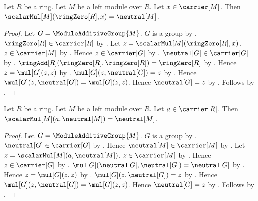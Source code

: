 \begin{theorem}\label{module_scalar_zero}
    Let $R$ be a ring.
    Let $M$ be a left module over $R$.
    Let $x\in\carrier[M]$.
    Then $\scalarMul[M](\ringZero[R],x)=\neutral[M]$.
\end{theorem}
\begin{proof}
    Let $G=\ModuleAdditiveGroup{M}$.
    $G$ is a group by .
    $\ringZero[R]\in\carrier[R]$ by .
    Let $z=\scalarMul[M](\ringZero[R],x)$.
    $z\in\carrier[M]$ by .
    Hence $z\in\carrier[G]$ by .
    $\neutral[G]\in\carrier[G]$ by
        .
    $\ringAdd[R](\ringZero[R],\ringZero[R])=\ringZero[R]$
        by .
    Hence $z=\mul[G](z,z)$ by
        .
    $\mul[G](z,\neutral[G])=z$ by
        .
    Hence $\mul[G](z,\neutral[G])=\mul[G](z,z)$.
    Hence $\neutral[G]=z$ by .
    Follows by .
\end{proof}

\begin{theorem}\label{module_scalar_vector_zero}
    Let $R$ be a ring.
    Let $M$ be a left module over $R$.
    Let $a\in\carrier[R]$.
    Then $\scalarMul[M](a,\neutral[M])=\neutral[M]$.
\end{theorem}
\begin{proof}
    Let $G=\ModuleAdditiveGroup{M}$.
    $G$ is a group by .
    $\neutral[G]\in\carrier[G]$ by
        .
    Hence $\neutral[M]\in\carrier[M]$ by
        .
    Let $z=\scalarMul[M](a,\neutral[M])$.
    $z\in\carrier[M]$ by .
    Hence $z\in\carrier[G]$ by .
    $\mul[G](\neutral[G],\neutral[G])=\neutral[G]$ by
        .
    Hence $z=\mul[G](z,z)$ by
        .
    $\mul[G](z,\neutral[G])=z$ by
        .
    Hence $\mul[G](z,\neutral[G])=\mul[G](z,z)$.
    Hence $\neutral[G]=z$ by .
    Follows by .
\end{proof}

